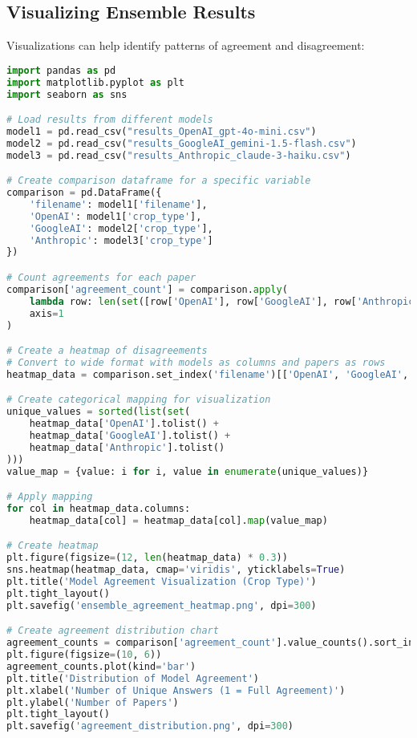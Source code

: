 \subsection{Visualizing Ensemble Results}

Visualizations can help identify patterns of agreement and disagreement:

\begin{commandbox}
\begin{lstlisting}[language=Python]
import pandas as pd
import matplotlib.pyplot as plt
import seaborn as sns

# Load results from different models
model1 = pd.read_csv("results_OpenAI_gpt-4o-mini.csv")
model2 = pd.read_csv("results_GoogleAI_gemini-1.5-flash.csv")
model3 = pd.read_csv("results_Anthropic_claude-3-haiku.csv")

# Create comparison dataframe for a specific variable
comparison = pd.DataFrame({
    'filename': model1['filename'],
    'OpenAI': model1['crop_type'],
    'GoogleAI': model2['crop_type'],
    'Anthropic': model3['crop_type']
})

# Count agreements for each paper
comparison['agreement_count'] = comparison.apply(
    lambda row: len(set([row['OpenAI'], row['GoogleAI'], row['Anthropic']])),
    axis=1
)

# Create a heatmap of disagreements
# Convert to wide format with models as columns and papers as rows
heatmap_data = comparison.set_index('filename')[['OpenAI', 'GoogleAI', 'Anthropic']]

# Create categorical mapping for visualization
unique_values = sorted(list(set(
    heatmap_data['OpenAI'].tolist() +
    heatmap_data['GoogleAI'].tolist() +
    heatmap_data['Anthropic'].tolist()
)))
value_map = {value: i for i, value in enumerate(unique_values)}

# Apply mapping
for col in heatmap_data.columns:
    heatmap_data[col] = heatmap_data[col].map(value_map)

# Create heatmap
plt.figure(figsize=(12, len(heatmap_data) * 0.3))
sns.heatmap(heatmap_data, cmap='viridis', yticklabels=True)
plt.title('Model Agreement Visualization (Crop Type)')
plt.tight_layout()
plt.savefig('ensemble_agreement_heatmap.png', dpi=300)

# Create agreement distribution chart
agreement_counts = comparison['agreement_count'].value_counts().sort_index()
plt.figure(figsize=(10, 6))
agreement_counts.plot(kind='bar')
plt.title('Distribution of Model Agreement')
plt.xlabel('Number of Unique Answers (1 = Full Agreement)')
plt.ylabel('Number of Papers')
plt.tight_layout()
plt.savefig('agreement_distribution.png', dpi=300)
\end{lstlisting}
\end{commandbox}



